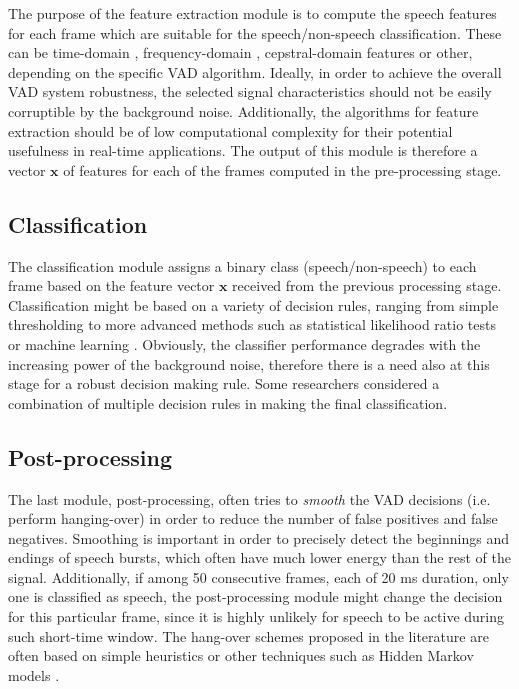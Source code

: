 The purpose of the feature extraction module is to compute the speech features for each frame which are suitable for the speech/non-speech classification. These can be time-domain \cite{Kida, Weaver}, frequency-domain \cite{Tuske, LTSD}, cepstral-domain \cite{Kotcher} features or other, depending on the specific VAD algorithm. Ideally, in order to achieve the overall VAD system robustness, the selected signal characteristics should not be easily corruptible by the background noise. Additionally, the algorithms for feature extraction should be of low computational complexity for their potential usefulness in real-time applications. The output of this module is therefore a vector $\mathbf{x}$ of features for each of the frames computed in the pre-processing stage.

\subsection{Classification}

The classification module assigns a binary class (speech/non-speech) to each frame based on the feature vector $\mathbf{x}$ received from the previous processing stage. Classification might be based on a variety of decision rules, ranging from simple thresholding \cite{G729} to more advanced methods such as statistical likelihood ratio tests \cite{Sohn, ImprovedLikelihood, SohnInitial} or machine learning \cite{XiaoLei, Stadtschnitzer}. Obviously, the classifier performance degrades with the increasing power of the background noise, therefore there is a need also at this stage for a robust decision making rule. Some researchers \cite{Kida} considered a combination of multiple decision rules in making the final classification.

\subsection{Post-processing}

The last module, post-processing, often tries to \emph{smooth} the VAD decisions (i.e. perform hanging-over) in order to reduce the number of false positives and false negatives. Smoothing is important in order to precisely detect the beginnings and endings of speech bursts, which often have much lower energy than the rest of the signal. Additionally, if among 50 consecutive frames, each of 20 ms duration, only one is classified as speech, the post-processing module might change the decision for this particular frame, since it is highly unlikely for speech to be active during such short-time window. The hang-over schemes  proposed in the literature are often based on simple heuristics \cite{G729} or other techniques such as Hidden Markov models \cite{Sohn}.

